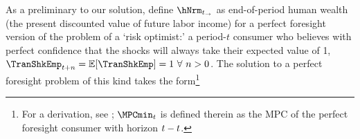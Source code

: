   As a preliminary to our solution, define $\hNrm_{\EndStp}$ as end-of-period human wealth (the present discounted value of future labor income) for a perfect foresight version of the problem of a `risk optimist:' a period-$t$ consumer who believes with perfect confidence that the shocks will always take their expected value of   {1, $\TranShkEmp_{\prd+n} = \Ex[\TranShkEmp]=1~\forall~n>0$.}  The solution to a perfect foresight problem of this kind takes the form\footnote{For a derivation, see \cite{BufferStockTheory}; $\MPCmin_{\prd}$ is defined therein as the MPC of the perfect foresight consumer with horizon $t-t$.}
